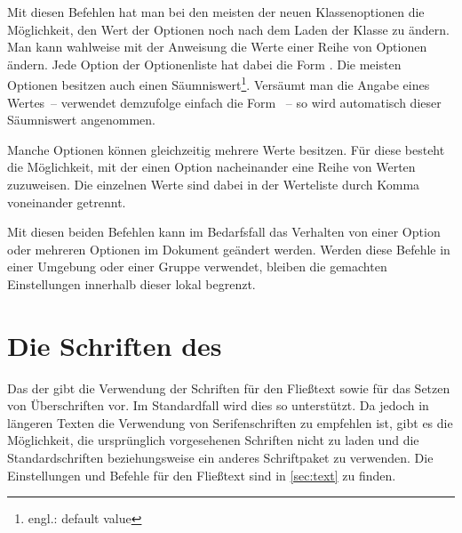 \begin{Declaration}{}
\begin{Declaration}{}
\printdeclarationlist%
%
%
%
Mit diesen Befehlen hat man bei den meisten der neuen Klassenoptionen die 
Möglichkeit, den Wert der Optionen noch nach dem Laden der Klasse zu ändern.
Man kann wahlweise mit der Anweisung  die Werte einer Reihe 
von Optionen ändern. Jede Option der Optionenliste hat dabei die Form
\PValue{=}. Die meisten Optionen besitzen auch einen 
Säumniswert\footnote{engl.: default value}. Versäumt man die Angabe eines 
Wertes~-- verwendet demzufolge einfach die Form ~-- so wird 
automatisch dieser Säumniswert angenommen.

Manche Optionen können gleichzeitig mehrere Werte besitzen. Für diese besteht 
die Möglichkeit, mit  der einen Option nacheinander eine 
Reihe von Werten zuzuweisen. Die einzelnen Werte sind dabei in der Werteliste 
durch Komma voneinander getrennt.

Mit diesen beiden Befehlen kann im Bedarfsfall das Verhalten von einer Option 
oder mehreren Optionen im Dokument geändert werden. Werden diese Befehle in 
einer Umgebung oder einer Gruppe verwendet, bleiben die gemachten Einstellungen 
innerhalb dieser lokal begrenzt.
\end{Declaration}
\end{Declaration}


\section{Die Schriften des \CDs}
\label{sec:fonts}
%
Das \CD der \TnUD gibt die Verwendung der Schriften \Univers für den Fließtext 
sowie \DIN für das Setzen von Überschriften vor. Im Standardfall wird dies so 
unterstützt. Da jedoch in längeren Texten die Verwendung von Serifenschriften 
zu empfehlen ist, gibt es die Möglichkeit, die ursprünglich vorgesehenen 
Schriften nicht zu laden und die Standardschriften beziehungsweise ein anderes 
Schriftpaket zu verwenden. Die Einstellungen und Befehle für den Fließtext sind 
in \autoref{sec:text} zu finden.

